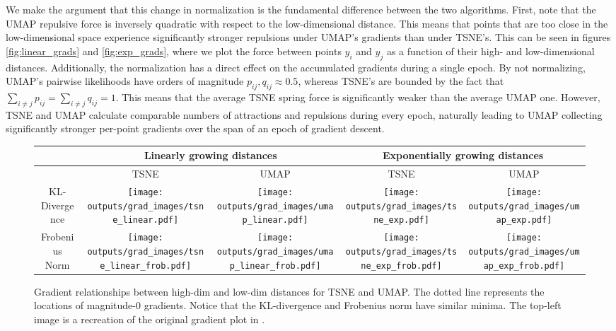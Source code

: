 \documentclass[sigconf, nonacm]{acmart}
\begin{document}
We make the argument that this change in normalization is the fundamental difference between the two algorithms. First, note that the UMAP repulsive force is
inversely quadratic with respect to the low-dimensional distance. This means that points that are too close in the low-dimensional space experience
significantly stronger repulsions under UMAP's gradients than under TSNE's. This can be seen in figures \ref{fig:linear_grads} and \ref{fig:exp_grads}, where we
plot the force between points $y_i$ and $y_j$ as a function of their high- and low-dimensional distances.
Additionally, the normalization has a direct effect on the accumulated gradients during a single epoch.
By not normalizing, UMAP's pairwise likelihoods have orders of magnitude $p_{ij}, q_{ij} \approx 0.5$, whereas TSNE's are bounded by the fact that $\sum_{i \neq j}
p_{ij} = \sum_{i \neq j} q_{ij} = 1$.
This means that the average TSNE spring force is significantly weaker than the average UMAP one.
However, TSNE and UMAP calculate comparable numbers of attractions and repulsions during every epoch, naturally leading to UMAP collecting significantly
stronger per-point gradients over the span of an epoch of gradient descent.


\begin{figure*}[h]
    \begin{tabular}{|c|c|c|c|c|}
        \hline
        & \multicolumn{2}{|c|}{Linearly growing distances} & \multicolumn{2}{|c|}{Exponentially growing distances} \\
        \hline
        & TSNE & UMAP & TSNE & UMAP \\
        \hline
        KL-Divergence &
        \texttt{[image: outputs/grad\_images/tsne\_linear.pdf]} & 
        \texttt{[image: outputs/grad\_images/umap\_linear.pdf]} & 
        \texttt{[image: outputs/grad\_images/tsne\_exp.pdf]} & 
        \texttt{[image: outputs/grad\_images/umap\_exp.pdf]}\\
        \hline
        Frobenius Norm &
        \texttt{[image: outputs/grad\_images/tsne\_linear\_frob.pdf]} & 
        \texttt{[image: outputs/grad\_images/umap\_linear\_frob.pdf]} & 
        \texttt{[image: outputs/grad\_images/tsne\_exp\_frob.pdf]} & 
        \texttt{[image: outputs/grad\_images/umap\_exp\_frob.pdf]}\\
        \hline
    \end{tabular}
\caption{Gradient relationships between high-dim and low-dim distances for TSNE and UMAP. The dotted line represents the locations of magnitude-$0$ gradients.
Notice that the KL-divergence and Frobenius norm have similar minima. The top-left image is a recreation of the original gradient plot in \cite{van2008visualizing}.}
\label{grad_plots}
\end{figure*}
\end{document}
